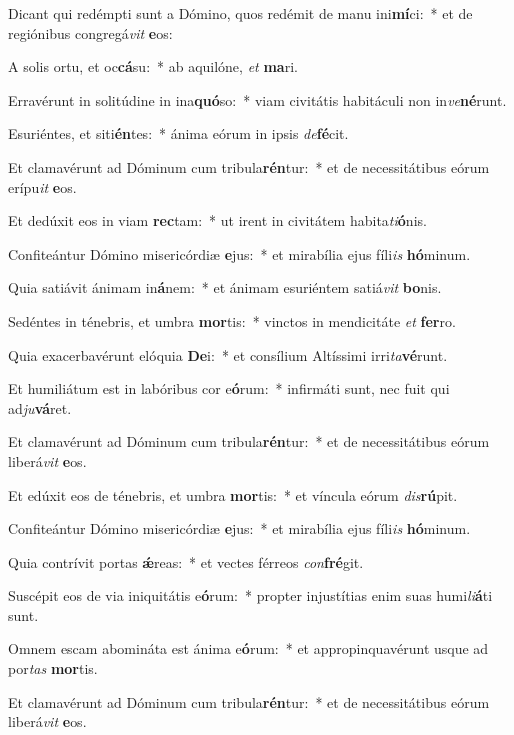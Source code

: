 \item Dicant qui redémpti sunt a Dómino, quos redémit de manu ini\textbf{mí}ci:~* et de regiónibus congregá\textit{vit} \textbf{e}os:
\item A solis ortu, et oc\textbf{cá}su:~* ab aquilóne, \textit{et} \textbf{ma}ri.
\item Erravérunt in solitúdine in ina\textbf{quó}so:~* viam civitátis habitáculi non in\textit{ve}\textbf{né}runt.
\item Esuriéntes, et siti\textbf{én}tes:~* ánima eórum in ipsis \textit{de}\textbf{fé}cit.
\item Et clamavérunt ad Dóminum cum tribula\textbf{rén}tur:~* et de necessitátibus eórum erípu\textit{it} \textbf{e}os.
\item Et dedúxit eos in viam \textbf{rec}tam:~* ut irent in civitátem habita\textit{ti}\textbf{ó}nis.
\item Confiteántur Dómino misericórdiæ \textbf{e}jus:~* et mirabília ejus fíli\textit{is} \textbf{hó}minum.
\item Quia satiávit ánimam in\textbf{á}nem:~* et ánimam esuriéntem satiá\textit{vit} \textbf{bo}nis.
\item Sedéntes in ténebris, et umbra \textbf{mor}tis:~* vinctos in mendicitáte \textit{et} \textbf{fer}ro.
\item Quia exacerbavérunt elóquia \textbf{De}i:~* et consílium Altíssimi irri\textit{ta}\textbf{vé}runt.
\item Et humiliátum est in labóribus cor e\textbf{ó}rum:~* infirmáti sunt, nec fuit qui ad\textit{ju}\textbf{vá}ret.
\item Et clamavérunt ad Dóminum cum tribula\textbf{rén}tur:~* et de necessitátibus eórum liberá\textit{vit} \textbf{e}os.
\item Et edúxit eos de ténebris, et umbra \textbf{mor}tis:~* et víncula eórum \textit{dis}\textbf{rú}pit.
\item Confiteántur Dómino misericórdiæ \textbf{e}jus:~* et mirabília ejus fíli\textit{is} \textbf{hó}minum.
\item Quia contrívit portas \textbf{ǽ}reas:~* et vectes férreos \textit{con}\textbf{fré}git.
\item Suscépit eos de via iniquitátis e\textbf{ó}rum:~* propter injustítias enim suas humi\textit{li}\textbf{á}ti sunt.
\item Omnem escam abomináta est ánima e\textbf{ó}rum:~* et appropinquavérunt usque ad por\textit{tas} \textbf{mor}tis.
\item Et clamavérunt ad Dóminum cum tribula\textbf{rén}tur:~* et de necessitátibus eórum liberá\textit{vit} \textbf{e}os.
